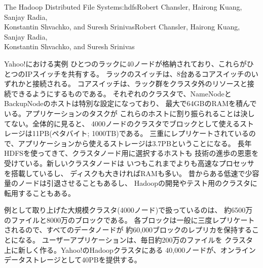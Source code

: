 \begin{aosachaptertoc}{The Hadoop Distributed File System}{s:hdfs}{Robert Chansler, Hairong Kuang, Sanjay Radia, \\ Konstantin Shvachko, and Suresh Srinivas}{Robert Chansler, Hairong Kuang, Sanjay Radia, \\ \hspace*{0.9cm} Konstantin Shvachko, and Suresh Srinivas}
\begin{aosasect1}{Yahoo!における実例}
ひとつのラックに40ノードが格納されており、これらがひとつのIPスイッチを共有する。
ラックのスイッチは、8台あるコアスイッチのいずれかと接続される。
コアスイッチは、ラック群をクラスタ外のリソースと接続できるようにするものである。
それぞれのクラスタで、NameNodeとBackupNodeのホストは特別な設定になっており、
最大で64GBのRAMを積んでいる。アプリケーションのタスクが
これらのホストに割り振られることは決してない。全体的に見ると、
4000ノードのクラスタでブロックとして使えるストレージは11PB(ペタバイト; 1000TB)である。
三重にレプリケートされているので、アプリケーションから使えるストレージは3.7PBということになる。
長年HDFSを使ってきて、クラスタノード用に選択するホストも
技術の進歩の恩恵を受けている。新しいクラスタノードは
いつもこれまでよりも高速なプロセッサを搭載しているし、
ディスクも大きければRAMも多い。
昔からある低速で少容量のノードは引退させることもあるし、
Hadoopの開発やテスト用のクラスタに転用することもある。

例として取り上げた大規模クラスタ(4000ノード)で扱っているのは、
約6500万のファイルと8000万のブロックである。
各ブロックは一般に三度レプリケートされるので、すべてのデータノードが
約60,000ブロックのレプリカを保持することになる。
ユーザーアプリケーションは、毎日約200万のファイルを
クラスタ上に新しく作る。Yahoo!のHadoopクラスタにある
40,000ノードが、オンラインデータストレージとして40PBを提供する。


\end{aosasect1}
\end{aosachaptertoc}
